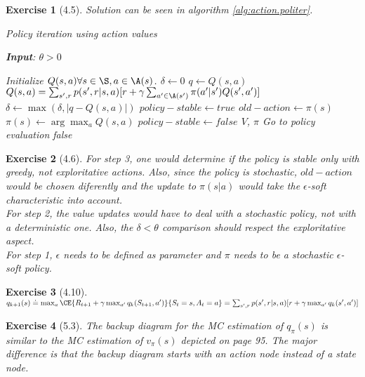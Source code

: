 \documentclass[a4paper]{scrartcl}
\theoremstyle{nonumberplain}
\newtheorem{ex}{Exercise}
\begin{document}
\begin{ex}[4.5]
	Solution can be seen in algorithm \autoref{alg:action.politer}.\\
\begin{algorithm}
	\caption{Policy iteration using action values}
	\label{alg:action.politer}
	\textbf{Input}: $\theta > 0$
	
	\begin{algorithmic}
		\State Initialize $Q(s,a) \forall s \in \S, a \in \A(s)$.
		\State $\delta \gets 0$
		\While{$\delta < \theta$}
		\State $q\gets Q(s,a)$
		\State $Q(s,a)=\sum_{s',r}p(s',r|s,a)[r+\gamma \sum_{a' \in \A(s')}\pi(a'|s')Q(s',a')]$
		\State $\delta \gets \max(\delta, |q-Q(s,a)|)$
		\EndFor
		\EndWhile
		\State $policy-stable \gets true$
		\State $old-action\gets\pi(s)$
		\State $\pi(s)\gets \arg\max_aQ(s,a)$
		\State $policy-stable \gets false$
		\EndIf
		\EndFor
		\State\Return $V$, $\pi$
		\Else
		\State Go to policy evaluation
		\EndIf
		\State\Return false
	\end{algorithmic}
\end{algorithm}
\end{ex}

\begin{ex}[4.6]
For step 3, one would determine if the policy is stable only with greedy, not exploritative actions. Also, since the policy is stochastic, $old-action$ would be chosen diferently and the update to $\pi(s|a)$ would take the $\epsilon$-soft characteristic into account.\\
For step 2, the value updates would have to deal with a stochastic policy, not with a deterministic one. Also, the $\delta < \theta$ comparison should respect the exploritative aspect.\\
For step 1, $\epsilon$ needs to be defined as parameter and $\pi$ needs to be a stochastic $\epsilon$-soft policy.
\end{ex}

\begin{ex}[4.10]

\begin{math}
q_{k+1}(s)\doteq\max_a\CE{R_{t+1}+\gamma \max_{a'}q_k(S_{t+1},a')}{S_t=s,A_t=a}\\
=\sum_{s',r}p(s',r|s,a)[r+\gamma \max_{a'} q_k(s',a')]
\end{math}
\end{ex}

\begin{ex}[5.3]
The backup diagram for the MC estimation of $q_\pi(s)$ is similar to the MC estimation of $v_\pi(s)$ depicted on page 95. The major difference is that the backup diagram starts with an action node instead of a state node.
\end{ex}
\end{document}

